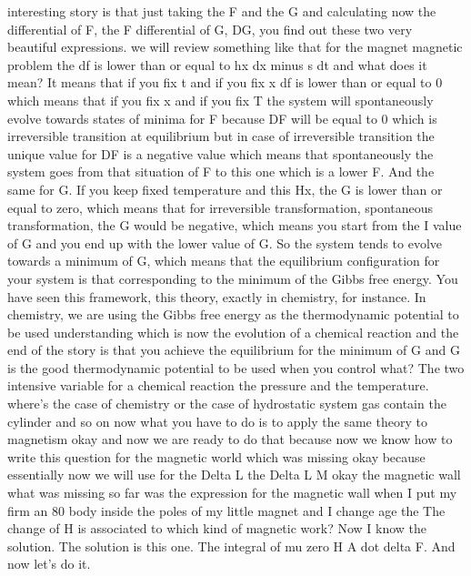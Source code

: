 interesting story is that just taking the F and the G and calculating now the differential of F, the F differential of G, DG, you find out these two very beautiful expressions. we will review something like that for the magnet magnetic problem the df is lower than or equal to hx dx minus s dt and what does it mean? It means that if you fix t and if you fix x df is lower than or equal to 0 which means that if you fix x and if you fix T the system will spontaneously evolve towards states of minima for F because DF will be equal to 0 which is irreversible transition at equilibrium but in case of irreversible transition the unique value for DF is a negative value which means that spontaneously the system goes from that situation of F to this one which is a lower F. And the same for G. If you keep fixed temperature and this Hx, the G is lower than or equal to zero, which means that for irreversible transformation, spontaneous transformation, the G would be negative, which means you start from the I value of G and you end up with the lower value of G. So the system tends to evolve towards a minimum of G, which means that the equilibrium configuration for your system is that corresponding to the minimum of the Gibbs free energy. You have seen this framework, this theory, exactly in chemistry, for instance. In chemistry, we are using the Gibbs free energy as the thermodynamic potential to be used understanding which is now the evolution of a chemical reaction and the end of the story is that you achieve the equilibrium for the minimum of G and G is the good thermodynamic potential to be used when you control what? The two intensive variable for a chemical reaction the pressure and the temperature. where's the case of chemistry or the case of hydrostatic system gas contain the cylinder and so on now what you have to do is to apply the same theory to magnetism okay and now we are ready to do that because now we know how to write this question for the magnetic world which was missing okay because essentially now we will use for the Delta L the Delta L M okay the magnetic wall what was missing so far was the expression for the magnetic wall when I put my firm an 80 body inside the poles of my little magnet and I change age the The change of H is associated to which kind of magnetic work? Now I know the solution. The solution is this one. The integral of mu zero H A dot delta F. And now let's do it.
